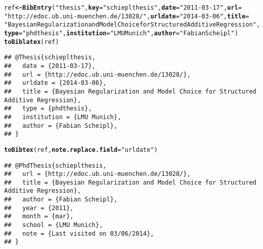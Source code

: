 \documentclass[article]{jss}\usepackage[]{graphicx}\usepackage[]{color}
\makeatletter
\newcommand{\hlstr}[1]{\textcolor[rgb]{0.125,0.125,1}{#1}}%
\newcommand{\hlstd}[1]{\textcolor[rgb]{0.251,0.251,0.282}{#1}}%
\newcommand{\hlkwb}[1]{\textcolor[rgb]{0.439,0.251,1}{\textbf{#1}}}%
\newcommand{\hlkwc}[1]{\textcolor[rgb]{0.529,0,0.184}{\textbf{#1}}}%
\newcommand{\hlkwd}[1]{\textcolor[rgb]{0.251,0.251,0.282}{\textbf{#1}}}%
\newenvironment{kframe}{%
 \def\at@end@of@kframe{}%
 \ifinner\ifhmode%
  \def\at@end@of@kframe{\end{minipage}}%
  \begin{minipage}{\columnwidth}%
 \fi\fi%
 \def\FrameCommand##1{\hskip\@totalleftmargin \hskip-\fboxsep
 \colorbox{shadecolor}{##1}\hskip-\fboxsep
     \hskip-\linewidth \hskip-\@totalleftmargin \hskip\columnwidth}%
 \MakeFramed {\advance\hsize-\width
   \@totalleftmargin\z@ \linewidth\hsize
   \@setminipage}}%
 {\par\unskip\endMakeFramed%
 \at@end@of@kframe}
\newenvironment{knitrout}{}{} %
\makeatother
\begin{document}
\begin{knitrout}
\color{fgcolor}\begin{kframe}
\begin{alltt}
\hlstd{ref} \hlkwb{<-} \hlkwd{BibEntry}\hlstd{(}\hlstr{"thesis"}\hlstd{,} \hlkwc{key} \hlstd{=} \hlstr{"schieplthesis"}\hlstd{,} \hlkwc{date} \hlstd{=} \hlstr{"2011-03-17"}\hlstd{,} \hlkwc{url} \hlstd{=}
\hlstr{"http://edoc.ub.uni-muenchen.de/13028/"}\hlstd{,} \hlkwc{urldate} \hlstd{=} \hlstr{"2014-03-06"}\hlstd{,} \hlkwc{title} \hlstd{=}
\hlstr{"Bayesian Regularization and Model Choice for Structured Additive Regression"}\hlstd{,}
\hlkwc{type} \hlstd{=} \hlstr{"phdthesis"}\hlstd{,} \hlkwc{institution} \hlstd{=} \hlstr{"LMU Munich"}\hlstd{,} \hlkwc{author} \hlstd{=} \hlstr{"Fabian Scheipl"}\hlstd{)}
\hlkwd{toBiblatex}\hlstd{(ref)}
\end{alltt}
\begin{lstlisting}[showstringspaces=false,style=output,columns=fullflexible,breaklines=true,inputencoding=utf8,extendedchars=	rue,breakautoindent=false,breakindent=0pt,inputencoding=utf8]
## @Thesis{schieplthesis,
##   date = {2011-03-17},
##   url = {http://edoc.ub.uni-muenchen.de/13028/},
##   urldate = {2014-03-06},
##   title = {Bayesian Regularization and Model Choice for Structured Additive Regression},
##   type = {phdthesis},
##   institution = {LMU Munich},
##   author = {Fabian Scheipl},
## }
\end{lstlisting}\begin{alltt}
\hlkwd{toBibtex}\hlstd{(ref,} \hlkwc{note.replace.field} \hlstd{=} \hlstr{"urldate"}\hlstd{)}
\end{alltt}
\begin{lstlisting}[showstringspaces=false,style=output,columns=fullflexible,breaklines=true,inputencoding=utf8,extendedchars=	rue,breakautoindent=false,breakindent=0pt,inputencoding=utf8]
## @PhdThesis{schieplthesis,
##   url = {http://edoc.ub.uni-muenchen.de/13028/},
##   title = {Bayesian Regularization and Model Choice for Structured Additive Regression},
##   author = {Fabian Scheipl},
##   year = {2011},
##   month = {mar},
##   school = {LMU Munich},
##   note = {Last visited on 03/06/2014},
## }
\end{lstlisting}\end{kframe}
\end{knitrout}
\end{document}
